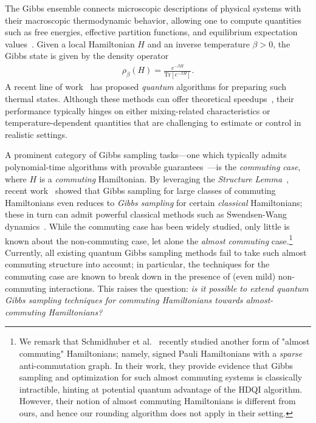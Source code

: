 \documentclass[11pt]{article}
\theoremstyle{plain}
\begin{document}
The Gibbs ensemble connects microscopic descriptions of physical systems with their macroscopic thermodynamic behavior, allowing one to compute quantities such as free energies, effective partition functions, and equilibrium expectation values~\cite{PathriaBeale2011,Chandler1987,Callen1985,LandauLifshitz1980,Sachdev2011,AltlandSimons2010,Mermin1965,Tuckerman2010,LandauBinder2014}. Given a local Hamiltonian $H$ and an inverse temperature $\beta > 0$, the Gibbs state is given by the density operator
\begin{align}\label{eq:gibbs-ex}
\rho_\beta(H) = \frac{e^{-\beta H}}{\mathrm{Tr}\left[e^{-\beta 
H}\right]}.
\end{align}
A recent line of work~\cite{Temme_2011,GilyenThermal23a,chen2023efficient,BCL24,rajakumar2024gibbs} has proposed \textit{quantum} algorithms for preparing such thermal states. Although these methods can offer theoretical speedups~\cite{BCL24,rajakumar2024gibbs}, their performance typically hinges on either mixing-related characteristics or temperature-dependent quantities that are challenging to estimate or control in realistic settings.

A prominent category of Gibbs sampling tasks---one which typically admits polynomial-time algorithms with provable guarantees~\cite{hwang2025gibbsstatepreparationcommuting,schmidhuber2025hamiltoniandecodedquantuminterferometry}---is the \emph{commuting case}, where $H$ is a \emph{commuting} Hamiltonian.
By leveraging the \emph{Structure 
Lemma}~\cite{bravyi2004commutativeversionklocalhamiltonian}, recent 
work~\cite{hwang2025gibbsstatepreparationcommuting} showed that Gibbs 
sampling for large classes of commuting Hamiltonians even reduces to 
\emph{Gibbs sampling} for certain \emph{classical} Hamiltonians; these 
in turn can admit powerful classical methods such as Swendsen-Wang 
dynamics~\cite{PhysRevLett.58.86,feng2022swendsenwangdynamicsferromagneticising}. While the commuting case has been widely studied, only little is known about the non-commuting case, let alone the \emph{almost commuting} case.\footnote{
We remark that Schmidhuber et 
al.~\cite{schmidhuber2025hamiltoniandecodedquantuminterferometry} 
recently studied another form of "almost commuting" Hamiltonians;
namely, signed Pauli Hamiltonians with a \emph{sparse} anti-commutation 
graph. In their work, they provide evidence that Gibbs sampling and 
optimization for such almost commuting 
systems is classically intractible, hinting at potential quantum 
advantage of the HDQI algorithm.
However, their notion of almost commuting Hamiltonians is different from 
ours, and hence our rounding algorithm does not apply in their setting.
}
Currently, all existing quantum Gibbs sampling methods fail to take 
such almost commuting structure into account; in particular, the 
techniques for the commuting case are known to break down in the presence of (even mild) non-commuting interactions. This raises the question: \emph{is it possible to extend quantum Gibbs sampling techniques for commuting Hamiltonians towards almost-commuting Hamiltonians?}
\end{document}
